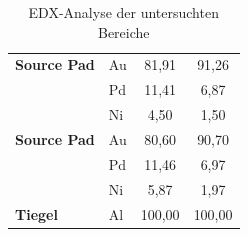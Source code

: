 \begin{table}[H]
{\begin{tabular}{|l|l|c|c|}
  \textbf{Source Pad}       & Au               & 81,91                                                & 91,26                                                \\
  \textbf{}                 & Pd               & 11,41                                                & 6,87                                                 \\
                            & Ni               & 4,50                                                 & 1,50                                                 \\ \hline
  \textbf{Source Pad}       & Au               & 80,60                                                & 90,70                                                \\
                            & Pd               & 11,46                                                & 6,97                                                 \\
                            & Ni               & 5,87                                                 & 1,97                                                 \\ \hline
  \textbf{Tiegel}           & Al               & 100,00                                               & 100,00                                               \\ \hline
  \end{tabular}}
  \caption{EDX-Analyse der untersuchten Bereiche}
  \label{Tab. 1}
  \end{table}
    

